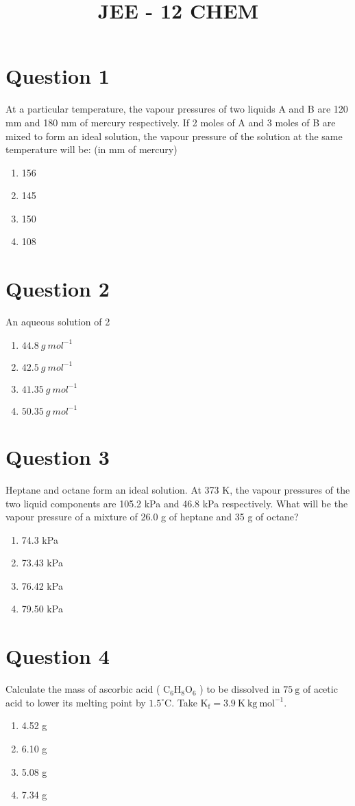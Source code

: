 \documentclass{article}
\title{JEE - 12 CHEM}
\begin{document}
                    \maketitle
                    \section*{Question 1}
At a particular temperature, the vapour pressures of two liquids A and B are 120 mm and 180 mm of mercury respectively. If 2 moles of A and 3 moles of B are mixed to form an ideal solution, the vapour pressure of the solution at the same temperature will be: (in mm of mercury)
\begin{enumerate}[label=(\alph*)]
\item 156
\item 145
\item 150
\item 108
\end{enumerate}
\newpage
\section*{Question 2}
An aqueous solution of 2%
\begin{enumerate}[label=(\alph*)]
\item \(44.8 {~g} {~mol}^{-1}\)
\item \(42.5 {~g} {~mol}^{-1}\)
\item \(41.35 {~g} {~mol}^{-1}\)
\item \(50.35 {~g} {~mol}^{-1}\)
\end{enumerate}
\newpage
\section*{Question 3}
Heptane and octane form an ideal solution. At 373 K, the vapour pressures of the two liquid components are 105.2 kPa and 46.8 kPa respectively. What will be the vapour pressure of a mixture of 26.0 g of heptane and 35 g of octane?
\begin{enumerate}[label=(\alph*)]
\item 74.3 kPa
\item 73.43 kPa
\item 76.42 kPa
\item 79.50 kPa
\end{enumerate}
\newpage
\section*{Question 4}
Calculate the mass of ascorbic acid ( \(\mathrm{C}_{6} \mathrm{H}_{8} \mathrm{O}_{6}\) ) to be dissolved in \(75 \mathrm{~g}\) of acetic acid to lower its melting point by \(1.5^{\circ} \mathrm{C}\). Take \( \mathrm{K}_{\mathrm{f}}=3.9 \mathrm{~K} \mathrm{~kg} \mathrm{~mol}^{-1}\).
\begin{enumerate}[label=(\alph*)]
\item 4.52 g
\item 6.10 g
\item 5.08 g
\item 7.34 g
\end{enumerate}
\newpage
\end{document}
